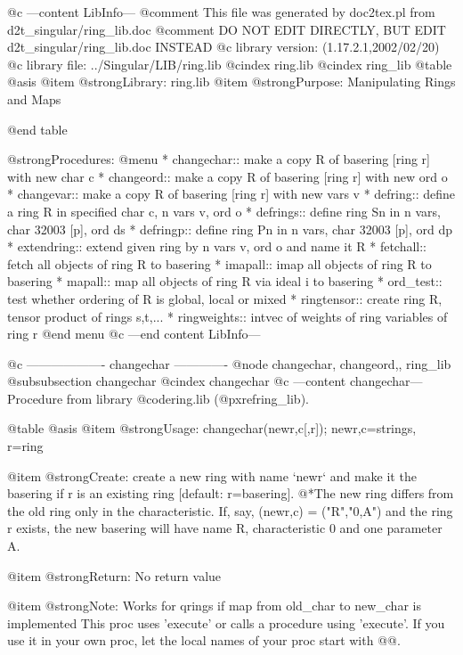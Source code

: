 @c ---content LibInfo---
@comment This file was generated by doc2tex.pl from d2t_singular/ring_lib.doc
@comment DO NOT EDIT DIRECTLY, BUT EDIT d2t_singular/ring_lib.doc INSTEAD
@c library version: (1.17.2.1,2002/02/20)
@c library file: ../Singular/LIB/ring.lib
@cindex ring.lib
@cindex ring_lib
@table @asis
@item @strong{Library:}
ring.lib
@item @strong{Purpose:}
      Manipulating Rings and Maps

@end table

@strong{Procedures:}
@menu
* changechar:: make a copy R of basering [ring r] with new char c
* changeord:: make a copy R of basering [ring r] with new ord o
* changevar:: make a copy R of basering [ring r] with new vars v
* defring:: define a ring R in specified char c, n vars v, ord o
* defrings:: define ring Sn in n vars, char 32003 [p], ord ds
* defringp:: define ring Pn in n vars, char 32003 [p], ord dp
* extendring:: extend given ring by n vars v, ord o and name it R
* fetchall:: fetch all objects of ring R to basering
* imapall:: imap all objects of ring R to basering
* mapall:: map all objects of ring R via ideal i to basering
* ord_test:: test whether ordering of R is global, local or mixed
* ringtensor:: create ring R, tensor product of rings s,t,...
* ringweights:: intvec of weights of ring variables of ring r
@end menu
@c ---end content LibInfo---

@c ------------------- changechar -------------
@node changechar, changeord,, ring_lib
@subsubsection changechar
@cindex changechar
@c ---content changechar---
Procedure from library @code{ring.lib} (@pxref{ring_lib}).

@table @asis
@item @strong{Usage:}
changechar(newr,c[,r]); newr,c=strings, r=ring

@item @strong{Create:}
create a new ring with name `newr` and make it the basering if r is
an existing ring [default: r=basering].
@*The new ring differs from the old ring only in the characteristic.
If, say, (newr,c) = ("R","0,A") and the ring r exists, the new
basering will have name R, characteristic 0 and one parameter A.

@item @strong{Return:}
No return value

@item @strong{Note:}
Works for qrings if map from old_char to new_char is implemented
This proc uses 'execute' or calls a procedure using 'execute'.
If you use it in your own proc, let the local names of your proc
start with @@.

